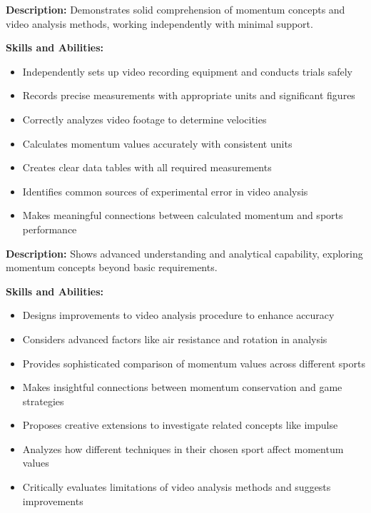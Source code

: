\documentclass[12pt]{article}
\begin{document}
\begin{tcolorbox}[colback=conceptgreen!10,colframe=conceptgreen,title=\textbf{Proficient}]
\textbf{Description:} Demonstrates solid comprehension of momentum concepts and video analysis methods, working independently with minimal support.

\textbf{Skills and Abilities:}
\begin{itemize}
\item Independently sets up video recording equipment and conducts trials safely
\item Records precise measurements with appropriate units and significant figures
\item Correctly analyzes video footage to determine velocities
\item Calculates momentum values accurately with consistent units
\item Creates clear data tables with all required measurements
\item Identifies common sources of experimental error in video analysis
\item Makes meaningful connections between calculated momentum and sports performance
\end{itemize}
\end{tcolorbox}

\begin{tcolorbox}[colback=conceptgreen!10,colframe=conceptgreen,title=\textbf{Extending}]
\textbf{Description:} Shows advanced understanding and analytical capability, exploring momentum concepts beyond basic requirements.

\textbf{Skills and Abilities:}
\begin{itemize}
\item Designs improvements to video analysis procedure to enhance accuracy
\item Considers advanced factors like air resistance and rotation in analysis
\item Provides sophisticated comparison of momentum values across different sports
\item Makes insightful connections between momentum conservation and game strategies
\item Proposes creative extensions to investigate related concepts like impulse
\item Analyzes how different techniques in their chosen sport affect momentum values
\item Critically evaluates limitations of video analysis methods and suggests improvements
\end{itemize}
\end{tcolorbox}
\end{document}
